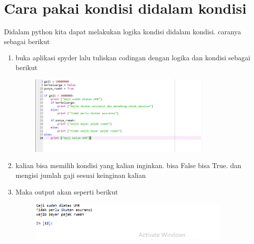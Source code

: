 \section*{Cara pakai kondisi didalam kondisi}

\par
Didalam python kita dapat melakukan logika kondisi didalam kondisi. caranya sebagai berikut


 \begin{enumerate}
	\item buka aplikasi spyder lalu tuliskan codingan dengan logika dan kondisi sebagai berikut
	\begin{figure} [h]
	\includegraphics[width=9cm]{if/if1.png}
	\centering
	\end{figure}
	
	 
	\item kalian bisa memilih kondisi yang kalian inginkan. bisa False bisa True. dan mengisi jumlah gaji sesuai keinginan kalian
	
	\item Maka output akan seperti berikut
	\begin{figure} [h]
	\includegraphics[width=10cm]{if/if2.png}
	\centering
	\end{figure}
	
	
	
	
	
    \end{enumerate}



